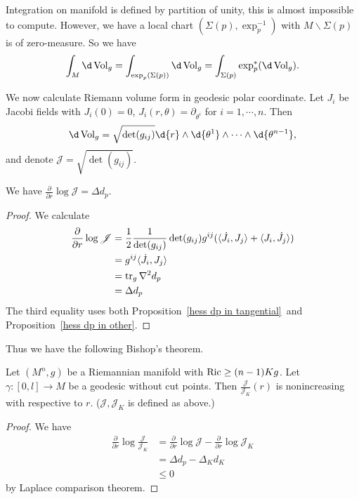 Integration on manifold is defined by partition of unity, this is almost impossible to compute.
However, we have a local chart $(\Sigma(p),\exp_p^{-1})$ with $M\backslash\Sigma(p)$ is of zero-measure.
So we have
\[\int_M\d\Vol_g=\int_{\exp_p(\Sigma(p))}\d\Vol_g=\int_{\Sigma(p)}\exp_p^*(\d\Vol_g).\]

We now calculate Riemann volume form in geodesic polar coordinate.
Let $J_i$ be Jacobi fields with $J_i(0)=0$, $J_i(r,\theta)=\partial_{\theta^i}$ for $i=1,\cdots,n$.
Then
\[\d\Vol_g=\sqrt{\det(g_{ij})}\d{r}\wedge\d{\theta^1}\wedge\cdots\wedge\d{\theta^{n-1}},\]
and denote $\mathscr{J}=\sqrt{\det(g_{ij})}$.

\begin{prop}\label{Laplace of distance function}
    We have $\frac{\partial{}}{\partial{r}}\log\mathscr{J}=\Delta d_p$.
\end{prop}
\begin{proof}
    We calculate
    \begin{align*}
        \frac{\partial{}}{\partial{r}}\log\mathscr{J}&=\frac{1}{2}\frac{1}{\det(g_{ij})}\det(g_{ij})g^{ij}(\langle\dot{J}_i,J_j\rangle+\langle J_i,\dot{J_j}\rangle)\\
        &=g^{ij}\langle\dot{J}_i,J_j\rangle\\
        &=\operatorname{tr}_g\nabla^2 d_p\\
        &=\Delta d_p
    \end{align*}
    The third equality uses both Proposition~\ref{hess dp in tangential}~and Proposition~\ref{hess dp in other}.
\end{proof}

Thus we have the following Bishop's theorem.
\begin{thm}[Bishop]\label{Bishop}\label{theorem!Bishop}
    Let $(M^n,g)$ be a Riemannian manifold with $\operatorname{Ric}\geq(n-1)Kg$.
    Let $\gamma:[0,l]\to M$ be a geodesic without cut points.
    Then $\frac{\mathscr{J}}{\mathscr{J}_K}(r)$ is nonincreasing with respective to $r$.
    ($\mathscr{J},\mathscr{J}_K$ is defined as above.)
\end{thm}
\begin{proof}
    We have
    \begin{align*}
        \frac{\partial{}}{\partial{r}}\log\frac{\mathscr{J}}{\mathscr{J}_K}&=\frac{\partial{}}{\partial{r}}\log\mathscr{J}-\frac{\partial{}}{\partial{r}}\log\mathscr{J}_K\\
        &=\Delta d_p-\Delta_Kd_K\\
        &\leq 0
    \end{align*}
    by Laplace comparison theorem.
\end{proof}

